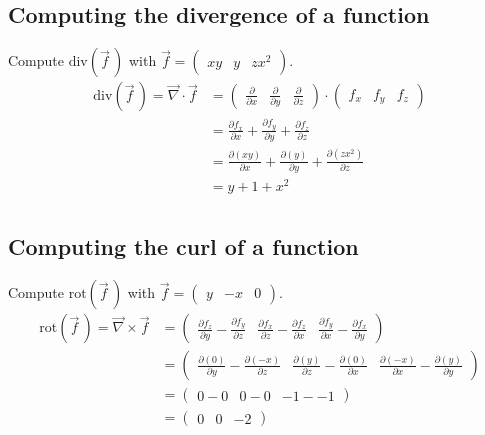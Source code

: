   \subsection{Computing the divergence of a function}
  Compute $\text{div}(\vec f \,)$ with $\vec f = \begin{pmatrix} xy & y & zx^2\end{pmatrix}$.
  \begin{align*}
    \text{div}(\vec f \,) = \vec\nabla \cdot \vec f 
      & = 
        \begin{pmatrix} 
          \frac{\partial}{\partial x} &
          \frac{\partial}{\partial y} &
          \frac{\partial}{\partial z}
        \end{pmatrix} \cdot
        \begin{pmatrix}
          f_x & f_y & f_z
        \end{pmatrix} \\
      & = 
        \frac{\partial f_x}{\partial x} +
        \frac{\partial f_y}{\partial y} +
        \frac{\partial f_z}{\partial z} \\
      & = 
        \frac{\partial (xy)}{\partial x} +
        \frac{\partial (y)}{\partial y} +
        \frac{\partial (zx^2)}{\partial z} \\
      & = y + 1 + x^2 \\
  \end{align*}

  \subsection{Computing the curl of a function}
  Compute $\text{rot}(\vec f \,)$ with $\vec f = \begin{pmatrix} y & -x & 0\end{pmatrix}$.
  \begin{align*}
    \text{rot}(\vec f \,) = \vec\nabla \times \vec f 
      & = 
        \begin{pmatrix} 
          \frac{\partial f_z}{\partial y} - \frac{\partial f_y}{\partial z} &
          \frac{\partial f_x}{\partial z} - \frac{\partial f_z}{\partial x} &
          \frac{\partial f_y}{\partial x} - \frac{\partial f_x}{\partial y} 
        \end{pmatrix} \\
      & = 
        \begin{pmatrix} 
          \frac{\partial (0)}{\partial y} - \frac{\partial (-x)}{\partial z} &
          \frac{\partial (y)}{\partial z} - \frac{\partial (0)}{\partial x} &
          \frac{\partial (-x)}{\partial x} - \frac{\partial (y)}{\partial y} 
        \end{pmatrix} \\
      & = 
        \begin{pmatrix}
          0 - 0 & 0 - 0 & -1 - -1 
        \end{pmatrix} \\
      & = 
        \begin{pmatrix}
          0 & 0 & -2
        \end{pmatrix} \\
  \end{align*}
  
